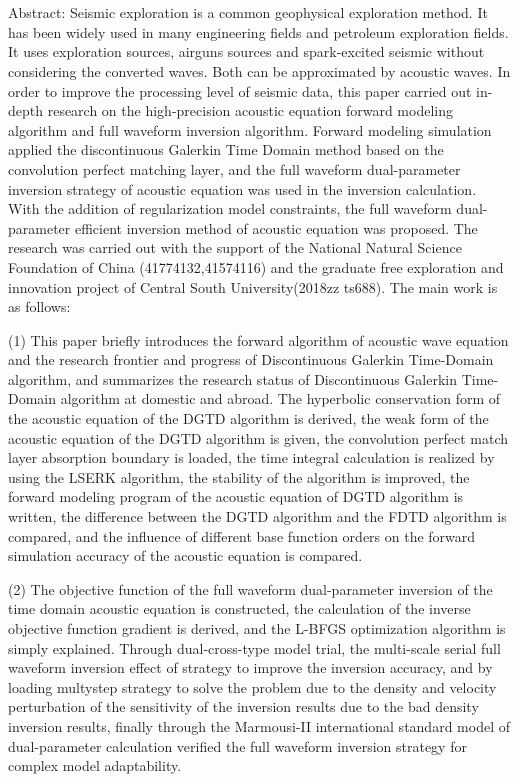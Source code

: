 \documentclass[12pt]{article}
\newcommand{\hei}{\CJKfamily{hei}}
\newcommand{\sanhao}{\fontsize{16pt}{\baselineskip}\selectfont}   %
\begin{document}
\section*{\sanhao\hei{}}
\noindent
Abstract: Seismic exploration is a common geophysical exploration method. It has been widely used in many engineering fields and petroleum exploration fields. It uses exploration sources, airguns sources and spark-excited seismic without considering the converted waves. Both can be approximated by acoustic waves. In order to improve the processing level of seismic data, this paper carried out in-depth research on the high-precision acoustic equation forward modeling algorithm and full waveform inversion algorithm. Forward modeling simulation applied the discontinuous Galerkin Time Domain method based on the convolution perfect matching layer, and the full waveform dual-parameter inversion strategy of acoustic equation was used in the inversion calculation. With the addition of regularization model constraints, the full waveform dual-parameter efficient inversion method of acoustic equation was proposed. The research was carried out with the support of the National Natural Science Foundation of China (41774132,41574116) and the graduate free exploration and innovation project of Central South University(2018zz
ts688). The main work is as follows:
\par
(1) This paper briefly introduces the forward algorithm of acoustic wave equation and the research frontier and progress of Discontinuous Galerkin Time-Domain algorithm, and summarizes the research status of Discontinuous Galerkin Time-Domain algorithm at domestic and abroad. The hyperbolic conservation form of the acoustic equation of the DGTD algorithm is derived, the weak form of the acoustic equation of the DGTD algorithm is given, the convolution perfect match layer absorption boundary is loaded, the time integral calculation is realized by using the LSERK algorithm, the stability of the algorithm is improved, the forward modeling program of the acoustic equation of DGTD algorithm is written, the difference between the DGTD algorithm and the FDTD algorithm is compared, and the influence of different base function orders on the forward simulation accuracy of the acoustic equation is compared.
\par
(2) The objective function of the full waveform dual-parameter inversion of the time domain acoustic equation is constructed, the calculation of the inverse objective function gradient is derived, and the L-BFGS optimization algorithm is simply explained. Through dual-cross-type model trial, the multi-scale serial full waveform inversion effect of strategy to improve the inversion accuracy, and by loading multystep strategy to solve the problem due to the density and velocity perturbation of the sensitivity of the inversion results due to the bad density inversion results, finally through the Marmousi-II international standard model of dual-parameter calculation verified the full waveform inversion strategy for complex model adaptability.
\end{document}
